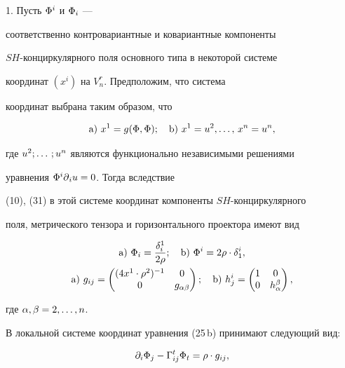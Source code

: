 1. Пусть ${\Phi}^i$ и ${\Phi}_i$ ---


соответственно контровариантные и ковариантные компоненты


$SH$-конциркулярного поля основного типа в некоторой системе


координат $(x^i)$ на $V^r_n$. Предположим, что система


координат выбрана таким образом, что


$$


\mathrm a) \ x^1=g(\F,\F);\quad \mathrm b)\ x^1=u^2,\ds,\,x^n=u^n,


$$


где $u^2;\dotsc ;u^n$ являются функционально независимыми решениями


уравнения ${\Phi}^{i}\partial {}_{i} u=0$. Тогда вследствие


(10), (31) в этой системе координат компоненты $SH$-конциркулярного


поля, метрического тензора и горизонтального проектора имеют вид


\begin{gather*}


\mathrm a)\ \F_i=\frac {{\de}^1_i}{2\ro};\quad


\mathrm b)\ \F^i=2\ro\cdot{{\de}^i_1}, \\


%


\mathrm a)\ g_{ij}=\begin{pmatrix}


({4x^1\cdot {\ro}^2})^{-1} & 0 \\ 0 & g_{\a\be}


\end{pmatrix};\quad \mathrm b)


\ h_{j}^i=\begin{pmatrix}


1 & 0 \\ 0 & h_{\a}^{\be}


\end{pmatrix}


,


\end{gather*}


где ${\alpha},{\beta}=2,\dotsc, n$.


В локальной системе координат уравнения (25\,b) принимают следующий вид:


\begin{equation}


{\partial}_i{\F_j}-{\Ga}^t_{ij}{\F_t}=\ro\cdot g_{ij},


\end{equation}


